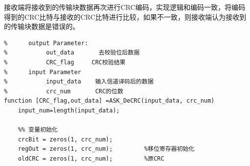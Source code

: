 \documentclass[UTF8]{ctexart}
\begin{document}
接收端将接收到的传输块数据再次进行CRC编码，实现逻辑和编码一致，将编码得到的CRC比特与接收的CRC比特进行比较，如果不一致，则接收端认为接收到的传输块数据是错误的。

\begin{lstlisting}[title=ASK\_DeCRC.m, frame=shadowbox]
%  Parameter List:
%      output Parameter:
%           out_data       去校验位后数据
%           CRC_flag     CRC校验结果
%      input Parameter
%           input_data    输入信道译码后的数据
%           crc_num       CRC的位数
function [CRC_flag,out_data] =ASK_DeCRC(input_data, crc_num)
    input_num=length(input_data);
    
    %% 变量初始化
    crcBit = zeros(1, crc_num);
    regOut = zeros(1, crc_num);         %移位寄存器初始化
    oldCRC = zeros(1, crc_num);         %原CRC
    

\end{lstlisting}
\end{document}
